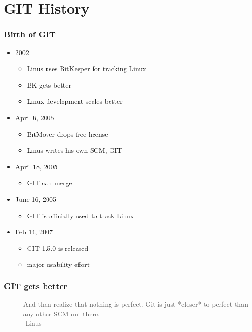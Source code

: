 \documentclass[english]{beamer}
\newcommand{\mysection}[2]{
  \hypertarget{#2}{}
  \section{#1}
  \label{#2}
}
\begin{document}
\mysection{GIT History}{_git_history}
\begin{frame}
\frametitle{Birth of GIT}
\begin{itemize}
        \item 2002
                \begin{itemize}
                        \item Linus uses BitKeeper for tracking Linux
                        \item BK gets better
                        \item Linux development scales better
                \end{itemize} 
        \pause{}
        \item April 6, 2005
                \begin{itemize}
                        \item BitMover drops free license
                        \item Linus writes his own SCM, GIT
                \end{itemize}
        \pause{}
        \item April 18, 2005
                \begin{itemize}
                        \item GIT can merge
                \end{itemize}
        \pause{}
        \item June 16, 2005
                \begin{itemize}
                        \item GIT is officially used to track Linux
                \end{itemize}
        \pause{}
        \item Feb 14, 2007
                \begin{itemize}
                        \item GIT 1.5.0 is released
                        \item major usability effort
                \end{itemize}
\end{itemize}
\end{frame}

\begin{frame}
\frametitle{GIT gets better}

\begin{quote}
        And then realize that nothing is perfect.
        Git is just *closer* to perfect than any
        other SCM out there. \\
        -Linus
\end{quote}

\end{frame}
\end{document}
